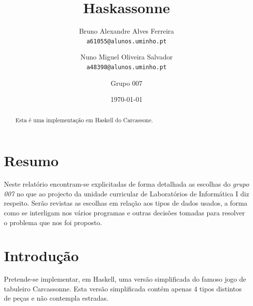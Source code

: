 \documentclass[11pt, a4paper, twoside]{article}
\begin{document}
\title{Haskassonne}
\date{\today}
\author{
  Bruno Alexandre Alves Ferreira\\
  \texttt{a61055@alunos.uminho.pt}
  \and
  Nuno Miguel Oliveira Salvador\\
  \texttt{a48398@alunos.uminho.pt}
  \and
  Grupo 007
}

\maketitle
\begin{abstract}
\begin{center}
  Esta é uma implementação em Haskell do Carcassone.
\end{center}
\end{abstract}
\newpage

\tableofcontents

\newpage
\section{Resumo}

Neste relatório encontram-se explicitadas de forma detalhada as escolhas do \textit{grupo 007} no que ao projecto da unidade curricular de Laboratórios de Informática I diz respeito. Serão revistas as escolhas em relação aos tipos de dados usados, a forma como se interligam nos vários programas e outras decisões tomadas para resolver o problema que nos foi proposto.

\newpage
\section{Introdução}

Pretende-se implementar, em Haskell, uma versão simplificada do famoso jogo de tabuleiro Carcassonne. Esta versão simplificada contém apenas 4 tipos distintos de peças e não contempla estradas.
\end{document}
